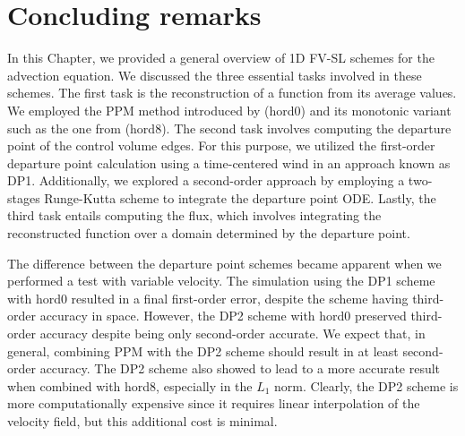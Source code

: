 \section{Concluding remarks}
\label{chp-adv1d-sec-conclusion}
In this Chapter, we provided a general overview of 1D FV-SL schemes for the advection equation.
We discussed the three essential tasks involved in these schemes.
The first task is the reconstruction of a function from its average values.
We employed the PPM method introduced by \citet{colella:1984} (hord0) and its monotonic variant such as the one from \citet{lin:2004} (hord8).
The second task involves computing the departure point of the control volume edges. For this purpose, 
we utilized the first-order departure point calculation  using a time-centered wind in an approach known as DP1.
Additionally, we explored a second-order approach by employing a two-stages Runge-Kutta scheme
to integrate the departure point ODE.
Lastly, the third task entails computing the flux, which involves integrating the 
reconstructed function over a domain determined by the departure point.

The difference between the departure point schemes became apparent when we performed a test 
with variable velocity. The simulation using the DP1 scheme with hord0 resulted in a final first-order 
error, despite the scheme having third-order accuracy in space. However, the DP2 scheme  with hord0
preserved third-order accuracy despite being only second-order accurate. We expect that, in 
general, combining PPM with the DP2 scheme should result in at least second-order accuracy.
The DP2 scheme also showed to lead to a more accurate result when combined with hord8, especially in the $L_1$ norm.
Clearly, the DP2 scheme is more computationally expensive since it requires linear interpolation of the velocity field, but this additional cost is minimal.
